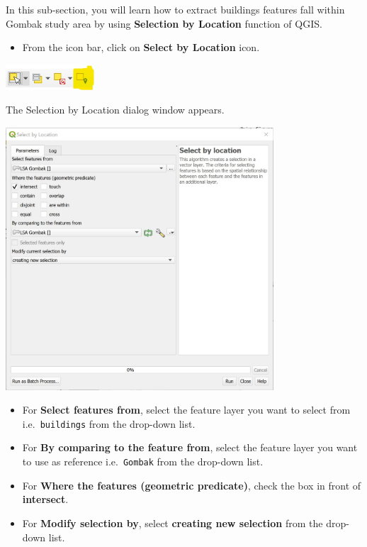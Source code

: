 \documentclass[
  letterpaper,
  DIV=11,
  numbers=noendperiod]{scrreprt}
\providecommand{\tightlist}{%
  \setlength{\itemsep}{0pt}\setlength{\parskip}{0pt}}\usepackage{longtable,booktabs,array}
\begin{document}
In this sub-section, you will learn how to extract buildings features
fall within Gombak study area by using \textbf{Selection by Location}
function of QGIS.

\begin{itemize}
\tightlist
\item
  From the icon bar, click on \textbf{Select by Location} icon.
\end{itemize}

\includegraphics[width=0.25\textwidth,height=\textheight]{./img07/image10.jpg}

The Selection by Location dialog window appears.

\includegraphics[width=0.75\textwidth,height=\textheight]{./img07/image11.jpg}

\begin{itemize}
\tightlist
\item
  For \textbf{Select features from}, select the feature layer you want
  to select from i.e.~\texttt{buildings} from the drop-down list.
\item
  For \textbf{By comparing to the feature from}, select the feature
  layer you want to use as reference i.e.~\texttt{Gombak} from the
  drop-down list.
\item
  For \textbf{Where the features (geometric predicate)}, check the box
  in front of \textbf{intersect}.
\item
  For \textbf{Modify selection by}, select \textbf{creating new
  selection} from the drop-down list.
\end{itemize}
\end{document}
